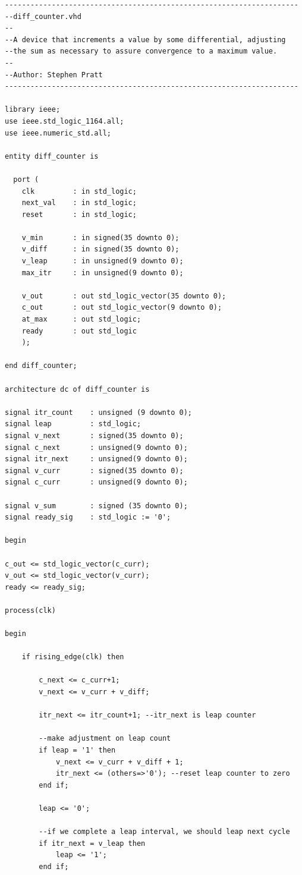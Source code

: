\documentclass{article}
\begin{document}
\begin{lstlisting}
---------------------------------------------------------------------
--diff_counter.vhd
--
--A device that increments a value by some differential, adjusting 
--the sum as necessary to assure convergence to a maximum value.
--
--Author: Stephen Pratt
---------------------------------------------------------------------

library ieee;
use ieee.std_logic_1164.all;
use ieee.numeric_std.all;

entity diff_counter is
  
  port (
    clk        	: in std_logic;
	next_val	: in std_logic;
	reset		: in std_logic;
    
	v_min		: in signed(35 downto 0);
	v_diff		: in signed(35 downto 0);
	v_leap		: in unsigned(9 downto 0);
	max_itr		: in unsigned(9 downto 0);
	
	v_out		: out std_logic_vector(35 downto 0);
	c_out		: out std_logic_vector(9 downto 0);
	at_max		: out std_logic;
	ready		: out std_logic
    );
  
end diff_counter;

architecture dc of diff_counter is 

signal itr_count 	: unsigned (9 downto 0);
signal leap			: std_logic;
signal v_next		: signed(35 downto 0);
signal c_next		: unsigned(9 downto 0);
signal itr_next		: unsigned(9 downto 0);
signal v_curr		: signed(35 downto 0);
signal c_curr		: unsigned(9 downto 0);

signal v_sum		: signed (35 downto 0);
signal ready_sig 	: std_logic := '0';

begin

c_out <= std_logic_vector(c_curr);
v_out <= std_logic_vector(v_curr);
ready <= ready_sig;

process(clk)

begin	

	if rising_edge(clk) then

		c_next <= c_curr+1;
		v_next <= v_curr + v_diff;
		
		itr_next <= itr_count+1; --itr_next is leap counter
		
		--make adjustment on leap count
		if leap = '1' then 
			v_next <= v_curr + v_diff + 1;
			itr_next <= (others=>'0'); --reset leap counter to zero
		end if;

		leap <= '0';
		
		--if we complete a leap interval, we should leap next cycle
		if itr_next = v_leap then
			leap <= '1';
		end if;	


\end{lstlisting}
\end{document}
